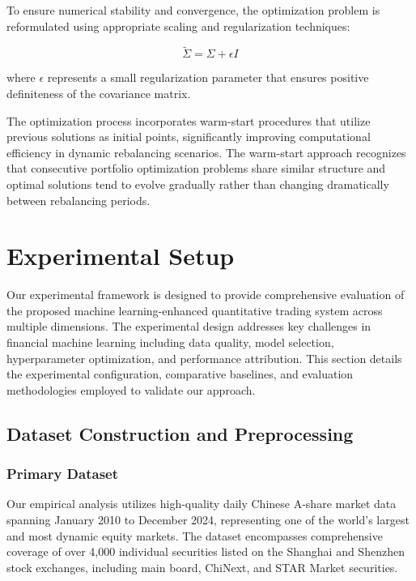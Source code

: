 \documentclass[conference]{IEEEtran}
\begin{document}
To ensure numerical stability and convergence, the optimization problem is reformulated using appropriate scaling and regularization techniques:

\begin{equation}
\tilde{\Sigma} = \Sigma + \epsilon I
\end{equation}

where $\epsilon$ represents a small regularization parameter that ensures positive definiteness of the covariance matrix.

The optimization process incorporates warm-start procedures that utilize previous solutions as initial points, significantly improving computational efficiency in dynamic rebalancing scenarios. The warm-start approach recognizes that consecutive portfolio optimization problems share similar structure and optimal solutions tend to evolve gradually rather than changing dramatically between rebalancing periods.


\section{Experimental Setup}

Our experimental framework is designed to provide comprehensive evaluation of the proposed machine learning-enhanced quantitative trading system across multiple dimensions. The experimental design addresses key challenges in financial machine learning including data quality, model selection, hyperparameter optimization, and performance attribution. This section details the experimental configuration, comparative baselines, and evaluation methodologies employed to validate our approach.

\subsection{Dataset Construction and Preprocessing}

\subsubsection{Primary Dataset}

Our empirical analysis utilizes high-quality daily Chinese A-share market data spanning January 2010 to December 2024, representing one of the world's largest and most dynamic equity markets. The dataset encompasses comprehensive coverage of over 4,000 individual securities listed on the Shanghai and Shenzhen stock exchanges, including main board, ChiNext, and STAR Market securities.
\end{document}
